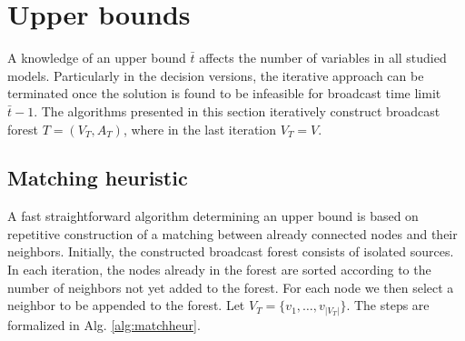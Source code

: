 \section{Upper bounds}

A knowledge of an upper bound $\bar{t}$ affects the number of variables in all studied models. 
Particularly in the decision versions, the iterative approach can be terminated once the solution is found to be infeasible for broadcast time limit $\bar{t}-1$.
The algorithms presented in this section iteratively construct broadcast forest $T=(V_T,A_T)$, where in the last iteration $V_T=V$.
\subsection{Matching heuristic}

A fast straightforward algorithm determining an upper bound is based on repetitive construction of a matching between already connected nodes and their neighbors.
Initially, the constructed broadcast forest consists of isolated sources. 
In each iteration, the nodes already in the forest are sorted according to the number of neighbors not yet added to the forest.
For each node we then select a neighbor to be appended to the forest.
Let $V_T=\{v_1,\dots,v_{|V_T|}\}$.
The steps are formalized in Alg. \ref{alg:matchheur}.

